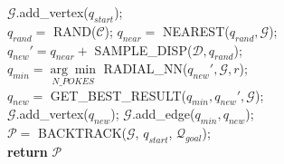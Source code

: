 \begin{algorithm}\footnotesize
\caption{PokeRRT*}\label{algo:pokerrt*}
  $\mathcal{G}.$add\_vertex($q_{start}$);\\
   {
      $q_{rand} =$ RAND($\mathcal{C}$); $q_{near} =$ NEAREST($q_{rand}, \mathcal{G}$);\\
      $q_{new}' = q_{near} + $ SAMPLE\_DISP($\mathcal{D}, q_{rand}$);\\
      $q_{min} = \underset{N\_POKES}{\arg\min}$ RADIAL\_NN($q_{new}', \mathcal{G}, r$);\\
      \vspace{4pt}
      $q_{new} =$ GET\_BEST\_RESULT($q_{min}, q_{new}', \mathcal{G}$);\\
      $\mathcal{G}.$add\_vertex($q_{new}$); $\mathcal{G}.$add\_edge($q_{min}, q_{new}$);\\
  }
$\mathcal{P} = $ BACKTRACK($\mathcal{G}$, $q_{start}$, $\mathcal{Q}_{goal}$);\\
\textbf{return} $\mathcal{P}$ 
\end{algorithm}
